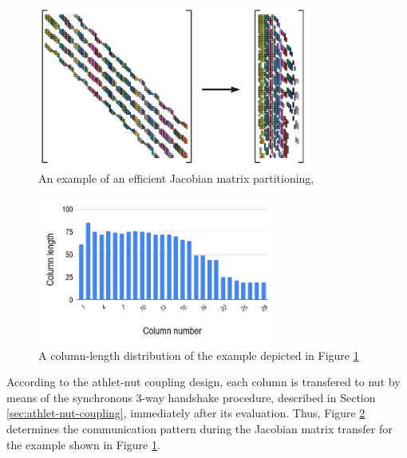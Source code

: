 \figpointer{\ref{fig:matrix-partitioning-example}}
\begin{figure}[htpb]
  \centering
  \includegraphics[width=0.8\textwidth]{figures/matrix-compression.png}
  \caption[An example of an efficient Jacobian matrix partitioning]{An example of an efficient Jacobian matrix partitioning, \cite{gebremedhin2005color}} \label{fig:matrix-partitioning-example}
\end{figure}


\begin{figure}[htpb]
  \centering
  \includegraphics[width=0.7\textwidth]{figures/matrix-compression-2.png}
  \caption{A column-length distribution of the example depicted in Figure \ref{fig:matrix-partitioning-example}} \label{fig:matrix-column-distribution}
\end{figure}


According to the \acrshort{athlet}-\acrshort{nut} coupling design, each column is transfered to \acrshort{nut} by means of the synchronous 3-way handshake procedure, described in Section \ref{sec:athlet-nut-coupling}, immediately after its evaluation. Thus,  Figure \ref{fig:matrix-column-distribution} determines the communication pattern during the Jacobian matrix transfer for the example shown in Figure \ref{fig:matrix-partitioning-example}.\\



